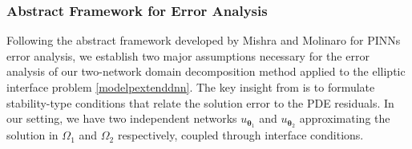 \documentclass{article}
\begin{document}
\subsubsection{Abstract Framework for Error Analysis}
Following the abstract framework developed by Mishra and Molinaro \cite{mishra2023estimates} for PINNs error analysis, we establish two major assumptions necessary for the error analysis of our two-network domain decomposition method applied to the elliptic interface problem \eqref{modelpextenddnn}. The key insight from \cite{mishra2023estimates} is to formulate stability-type conditions that relate the solution error to the PDE residuals. In our setting, we have two independent networks $u_{\boldsymbol{\theta}_1}$ and $u_{\boldsymbol{\theta}_2}$ approximating the solution in $\Omega_1$ and $\Omega_2$ respectively, coupled through interface conditions.
\end{document}
